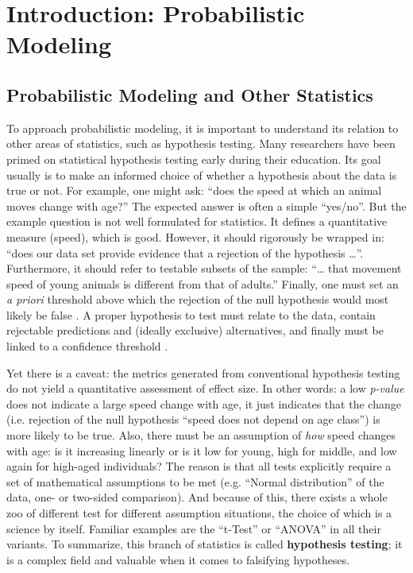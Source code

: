\FloatBarrier
\clearpage
\section{Introduction: Probabilistic Modeling}
\label{sec:org2074548}
\subsection{Probabilistic Modeling and Other Statistics}
\label{sec:org0cc6a35}
To approach probabilistic modeling, it is important to understand its relation to other areas of statistics, such as hypothesis testing.
Many researchers have been primed on statistical hypothesis testing early during their education.
Its goal usually is to make an informed choice of whether a hypothesis about the data is true or not.
For example, one might ask: ``does the speed at which an animal moves change with age?''
The expected answer is often a simple ``yes/no''.
But the example question is not well formulated for statistics.
It defines a quantitative measure (speed), which is good.
However, it should rigorously be wrapped in: ``does our data set provide evidence that a rejection of the hypothesis \ldots{}''.
Furthermore, it should refer to testable subsets of the sample: ``\ldots{} that movement speed of young animals is different from that of adults.''
Finally, one must set an \emph{a priori} threshold above which the rejection of the null hypothesis would most likely be false \citep[called ``p-value'', too commonly desired to be below \(p=0.05\),][]{Dallal2003}.
A proper hypothesis to test must relate to the data, contain rejectable predictions and (ideally exclusive) alternatives, and finally must be linked to a confidence threshold \citep{Chamberlin1890,Platt1964,Popper2002}.

Yet there is a caveat: the metrics generated from conventional hypothesis testing do not yield a quantitative assessment of effect size.
In other words: a low \emph{p-value} does not indicate a large speed change with age, it just indicates that the change (i.e. rejection of the null hypothesis ``speed does not depend on age class'') is more likely to be true.
Also, there must be an assumption of \emph{how} speed changes with age: is it increasing linearly or is it low for young, high for middle, and low again for high-aged individuals?
The reason is that all tests explicitly require a set of mathematical assumptions to be met (e.g. ``Normal distribution'' of the data, one- or two-sided comparison).
And because of this, there exists a whole zoo of different test for different assumption situations, the choice of which is a science by itself.
Familiar examples are the ``t-Test'' or ``ANOVA'' in all their variants.
To summarize, this branch of statistics is called \textbf{hypothesis testing}; it is a complex field and valuable when it comes to falsifying hypotheses.


